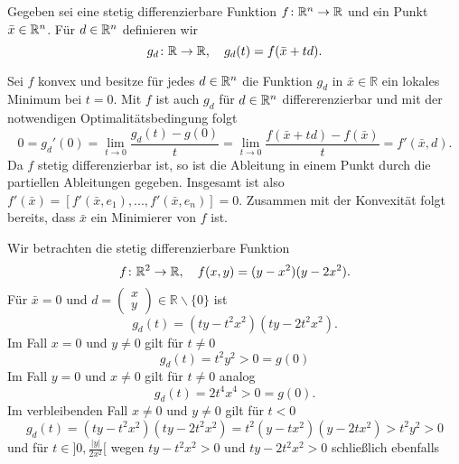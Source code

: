 
Gegeben sei eine stetig differenzierbare Funktion $f\colon \mathbb{R}^n\to\mathbb{R}$ und ein Punkt $\bar x\in\mathbb{R}^n$.
Für $d\in\mathbb{R}^n$ definieren wir
\begin{displaymath}
 g_d\colon \mathbb{R}\to\mathbb{R} , \quad g_d(t)=f(\bar x+td). 
\end{displaymath}
\begin{compactenum}[(i)]
 \item Sei $f$ konvex und besitze für jedes $d\in\mathbb{R}^n$ die Funktion $g_d$ in $\bar x\in\mathbb{R}$ ein lokales Minimum bei $t=0$.
 Mit $f$ ist auch $g_d$ für $d\in \mathbb{R}^n$ differerenzierbar und mit der notwendigen Optimalitätsbedingung folgt
 \begin{displaymath}
  0=g_d'(0)=\lim_{t\to 0} \frac{g_d(t)-g(0)}{t}=\lim_{t\to0}\frac{f(\bar x+td)-f(\bar x)}{t}=f'(\bar x,d).
 \end{displaymath}
 Da $f$ stetig differenzierbar ist, so ist die Ableitung in einem Punkt durch die partiellen Ableitungen gegeben.
 Insgesamt ist also $f'(\bar x)=[f'(\bar x,e_1),...,f'(\bar x,e_n)]=0$. Zusammen mit der Konvexität folgt bereits, dass $\bar x$ ein Minimierer von $f$ ist.
 \\
 \item Wir betrachten die stetig differenzierbare Funktion
 \begin{displaymath}
 f\colon \mathbb{R}^2\to\mathbb{R},\quad f(x,y)=(y-x^2)(y-2x^2).
 \end{displaymath}
 Für $\bar x=0$ und $d=\begin{pmatrix}x\\y\end{pmatrix}\in\mathbb{R}\backslash\{0\}$ ist 
 \begin{displaymath}
  g_d(t)=(ty-t^2x^2)(ty-2t^2x^2).
 \end{displaymath} 
 Im Fall $x=0$ und $y\neq 0$ gilt für $t\neq 0$
 \begin{displaymath}
  g_d(t)=t^2y^2>0=g(0)
 \end{displaymath}
 Im Fall $y=0$ und $x\neq 0$ gilt für $t\neq 0$ analog
 \begin{displaymath}
   g_d(t)=2t^4x^4>0=g(0).
 \end{displaymath}
Im verbleibenden Fall $x\neq 0$ und $y\neq 0$ gilt für $t<0$
 \begin{displaymath}
   g_d(t)=(ty-t^2x^2)(ty-2t^2x^2)=t^2(y-tx^2)(y-2tx^2)>t^2y^2>0
 \end{displaymath}
und für $t\in]0,\frac{|y|}{2x^2}[$ wegen $ty-t^2x^2>0$ und $ty-2t^2x^2>0$ schließlich ebenfalls

\end{compactenum}
